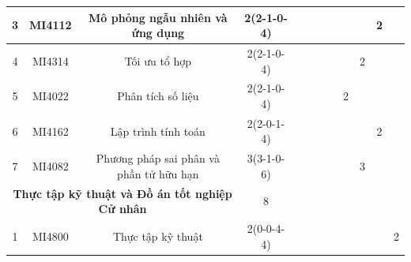 \documentclass[12pt,a4paper]{report}
\begin{document}
\begin{landscape}
\begin{longtable}[c]{|c|c|c|c|c|c|c|c|c|c|c|c|}
        3                             & MI4112                          & Mô phỏng ngẫu nhiên và ứng dụng                              & 2(2-1-0-4)                                                                           &             &             &             &             &             &             & 2           &             \\ \hline
        4                             & MI4314                          & Tối ưu tổ hợp                                                & 2(2-1-0-4)                                                                           &             &             &             &             &             & 2           &             &             \\ \hline
        5                             & MI4022                          & Phân tích số liệu                                            & 2(2-1-0-4)                                                                           &             &             &             &             & 2           &             &             &             \\ \hline
        6                             & MI4162                          & Lập trình tính toán                                          & 2(2-0-1-4)                                                                           &             &             &             &             &             &             & 2           &             \\ \hline
        7                             & MI4082                          & Phương pháp sai phân và phần tử hữu hạn                      & 3(3-1-0-6)                                                                           &             &             &             &             &             & 3           &             &             \\ \hline
        \multicolumn{3}{|c|}{\textbf{Thực tập kỹ thuật và Đồ án tốt nghiệp Cử nhân}}                                                   & 8                                                                                    &             &             &             &             &             &             &             &             \\ \hline
        1                             & MI4800                          & Thực tập kỹ thuật                                            & 2(0-0-4-4)                                                                           &             &             &             &             &             &             &             & 2           \\ \hline

\end{longtable}
\end{landscape}
\end{document}
